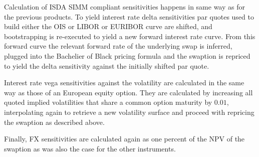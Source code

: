 \documentclass[../Thesis_AHoecherl.tex]{subfiles}
\begin{document}
    Calculation of \gls{ISDA SIMM} compliant sensitivities happens in same way as for the previous products.
    To yield interest rate delta sensitivities par quotes used to build either the OIS or LIBOR or EURIBOR curve are shifted, and bootstrapping is re-executed to yield a new forward interest rate curve.
    From this forward curve the relevant forward rate of the underlying swap is inferred, plugged into the Bachelier of Black pricing formula and the swaption is repriced to yield the delta sensitivity against the initially shifted par quote.

    Interest rate vega sensitivities against the volatility are calculated in the same way as those of an European equity option.
    They are calculated by increasing all quoted implied volatilities that share a common option maturity by $0.01$, interpolating again to retrieve a new volatility surface and proceed with repricing the swaption as described above.

    Finally, FX sensitivities are calculated again as one percent of the NPV of the swaption as was also the case for the other instruments.
\end{document}
